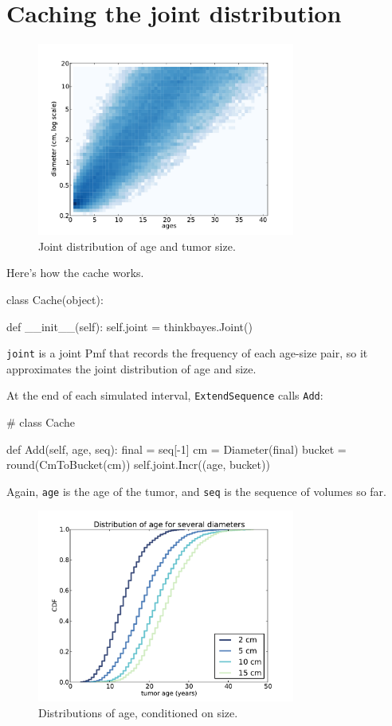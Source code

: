 \documentclass[12pt]{book}
\theoremstyle{exercise}
\begin{document}
\section{Caching the joint distribution}

\begin{figure}
\centerline{\includegraphics[height=2.5in]{figs/kidney8.pdf}}
\caption{Joint distribution of age and tumor size.}
\label{fig.kidney8}
\end{figure}

Here's how the cache works.  

\begin{code}
class Cache(object):

    def __init__(self):
        self.joint = thinkbayes.Joint()
\end{code}

{\tt joint} is a joint Pmf that records the
frequency of each age-size pair, so it approximates the
joint distribution of age and size.

At the end of each simulated interval, {\tt ExtendSequence} calls
{\tt Add}:

\begin{code}
# class Cache

    def Add(self, age, seq):
        final = seq[-1]
        cm = Diameter(final)
        bucket = round(CmToBucket(cm))
        self.joint.Incr((age, bucket))
\end{code}

Again, {\tt age} is the age of the tumor, and {\tt seq} is the
sequence of volumes so far.

\begin{figure}
\centerline{\includegraphics[height=2.5in]{figs/kidney6.pdf}}
\caption{Distributions of age, conditioned on size.}
\label{fig.kidney6}
\end{figure}
\end{document}
